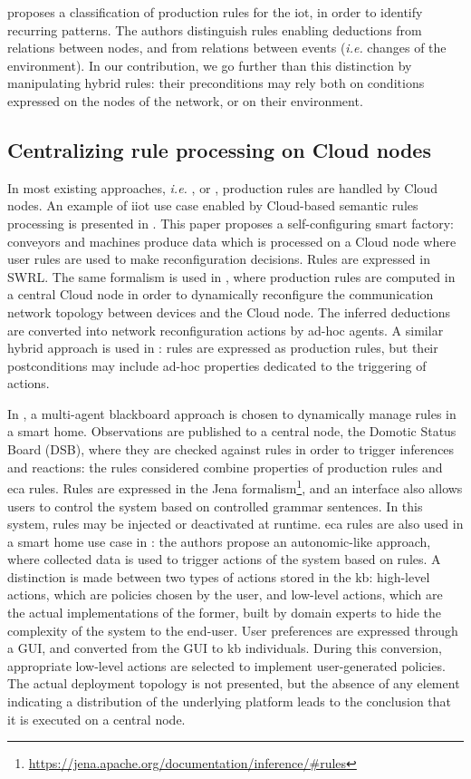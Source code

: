 \documentclass[sw]{iosart2x}
\begin{document}
\cite{Sun2014} proposes a classification of production rules for the \gls{iot}, in order to identify recurring patterns.
The authors distinguish rules enabling deductions from relations between nodes, and from relations between events (\textit{i.e.} changes of the environment).
In our contribution, we go further than this distinction by manipulating hybrid rules: their preconditions may rely both on conditions expressed on the nodes of the network, or on their environment.

\subsection{Centralizing rule processing on Cloud nodes}

In most existing approaches, \textit{i.e.} \cite{ZangLi55}, \cite{Gyrard2017} or \cite{xu2017network}, production rules are handled by Cloud nodes.
An example of \gls{iiot} use case enabled by Cloud-based semantic rules processing is presented in \cite{Wang2018}.
This paper proposes a self-configuring smart factory: conveyors and machines produce data which is processed on a Cloud node where user rules are used to make reconfiguration decisions.
Rules are expressed in SWRL.
The same formalism is used in \cite{Rodriguez2010}, where production rules are computed in a central Cloud node in order to dynamically reconfigure the communication network topology between devices and the Cloud node.
The inferred deductions are converted into network reconfiguration actions by ad-hoc agents.
A similar hybrid approach is used in \cite{Evchina2015}: rules are expressed as production rules, but their postconditions may include ad-hoc properties dedicated to the triggering of actions.

In \cite{Kasnesis2015}, a multi-agent blackboard approach is chosen to dynamically manage rules in a smart home. 
Observations are published to a central node, the Domotic Status Board (DSB), where they are checked against rules in order to trigger inferences and reactions: the rules considered combine properties of production rules and \gls{eca} rules.
Rules are expressed in the Jena formalism\footnote{\url{https://jena.apache.org/documentation/inference/\#rules}}, and an interface also allows users to control the system based on controlled grammar sentences.
In this system, rules may be injected or deactivated at runtime.
\gls{eca} rules are also used in a smart home use case in \cite{Mainetti2015}: the authors propose an autonomic-like approach, where collected data is used to trigger actions of the system based on rules.
A distinction is made between two types of actions stored in the \gls{kb}: high-level actions, which are policies chosen by the user, and low-level actions, which are the actual implementations of the former, built by domain experts to hide the complexity of the system to the end-user.
User preferences are expressed through a GUI, and converted from the GUI to \gls{kb} individuals. 
During this conversion, appropriate low-level actions are selected to implement user-generated policies.
The actual deployment topology is not presented, but the absence of any element indicating a distribution of the underlying platform leads to the conclusion that it is executed on a central node.
\end{document}
